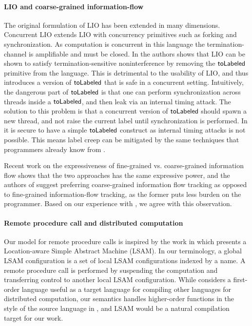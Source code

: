 \paragraph{LIO and coarse-grained information-flow}
The original formulation of LIO \cite{SRMMlio} has been extended in many dimensions. Concurrent LIO \cite{Stefan:2012:ACT:2364527.2364557} extends LIO with concurrency primitives such as forking and synchronization. As computation is concurrent in this language the termination-channel is amplifiable and must be closed. In \cite{Stefan:2012:ACT:2364527.2364557} the authors shows that LIO can be shown to satisfy termination-sensitive noninterference by removing the $\mathsf{toLabeled}$ primitive from the language. This is detrimental to the usability of LIO, and thus \cite{Stefan:2012:ACT:2364527.2364557} introduces a version of $\mathsf{toLabeled}$ that is safe in a concurrent setting. Intuitively, the dangerous part of $\mathsf{toLabeled}$ is that one can perform synchronization across threads inside a $\mathsf{toLabeled}$, and then leak via an internal timing attack. The solution to this problem is that a concurrent version of $\mathsf{toLabeled}$ should spawn a new thread, and not raise the current label until synchronization is performed. In \lang{} it is secure to have a simple $\mathsf{toLabeled}$ construct as internal timing attacks is not possible. This means label creep can be mitigated by the same techniques that programmers already know from \cite{SRMMlio}.

Recent work \cite{Rajani:2017:TSI:3051528.3051531} on the expressiveness of fine-grained vs. coarse-grained information flow shows that the two approaches has the same expressive power, and the authors of \cite{Rajani:2017:TSI:3051528.3051531} suggest preferring coarse-grained information flow tracking as opposed to fine-grained information-flow tracking, as the former puts less burden on the programmer. Based on our experience with \lang{}, we agree with this observation.

\paragraph{Remote procedure call and distributed computation}
Our model for remote procedure calls is inspired by the work in \cite{10.1007/978-3-642-25462-8_28} which presents a Location-aware Simple Abstract Machine (LSAM). In our terminology, a global LSAM configuration is a set of local LSAM configurations indexed by a name. A remote procedure call is performed by suspending the computation and transferring control to another local LSAM configuration. While \cite{10.1007/978-3-642-25462-8_28} considers a first-order language useful as a target language for compiling other languages for distributed computation, our semantics handles higher-order functions in the style of the source language in \cite{Cooper:2009:RC:1599410.1599439}, and LSAM would be a natural compilation target for our work.
